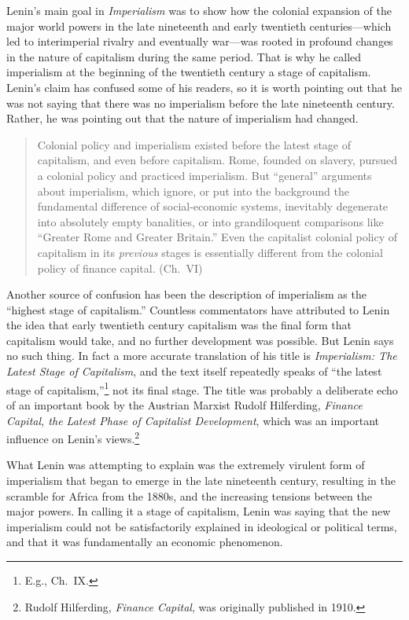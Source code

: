 Lenin's main goal in \emph{Imperialism} was to show how the colonial expansion of the major world powers in the late nineteenth and early twentieth centuries---which led to interimperial rivalry and eventually war---was rooted in profound changes in the nature of capitalism during the same period. That is why he called imperialism at the beginning of the twentieth century a stage of capitalism. Lenin's claim has confused some of his readers, so it is worth pointing out that he was not saying that there was no imperialism before the late nineteenth century. Rather, he was pointing out that the nature of imperialism had changed.

\blockquote{Colonial policy and imperialism existed before the latest stage of capitalism, and even before capitalism. Rome, founded on slavery, pursued a colonial policy and practiced imperialism. But ``general'' arguments about imperialism, which ignore, or put into the background the fundamental difference of social-economic systems, inevitably degenerate into absolutely empty banalities, or into grandiloquent comparisons like ``Greater Rome and Greater Britain.'' Even the capitalist colonial policy of capitalism in its \emph{previous} stages is essentially different from the colonial policy of finance capital. (Ch.\ VI)}

Another source of confusion has been the description of imperialism as the ``highest stage of capitalism.'' Countless commentators have attributed to Lenin the idea that early twentieth century capitalism was the final form that capitalism would take, and no further development was possible. But Lenin says no such thing. In fact a more accurate translation of his title is \emph{Imperialism: The Latest Stage of Capitalism}, and the text itself repeatedly speaks of ``the latest stage of capitalism,''\footnote{E.g., Ch.\ IX.} not its final stage. The title was probably a deliberate echo of an important book by the Austrian Marxist Rudolf Hilferding, \emph{Finance Capital, the Latest Phase of Capitalist Development}, which was an important influence on Lenin's views.\footnote{Rudolf Hilferding, \emph{Finance Capital}, was originally published in 1910.}

What Lenin was attempting to explain was the extremely virulent form of imperialism that began to emerge in the late nineteenth century, resulting in the scramble for Africa from the 1880s, and the increasing tensions between the major powers. In calling it a stage of capitalism, Lenin was saying that the new imperialism could not be satisfactorily explained in ideological or political terms, and that it was fundamentally an economic phenomenon.

